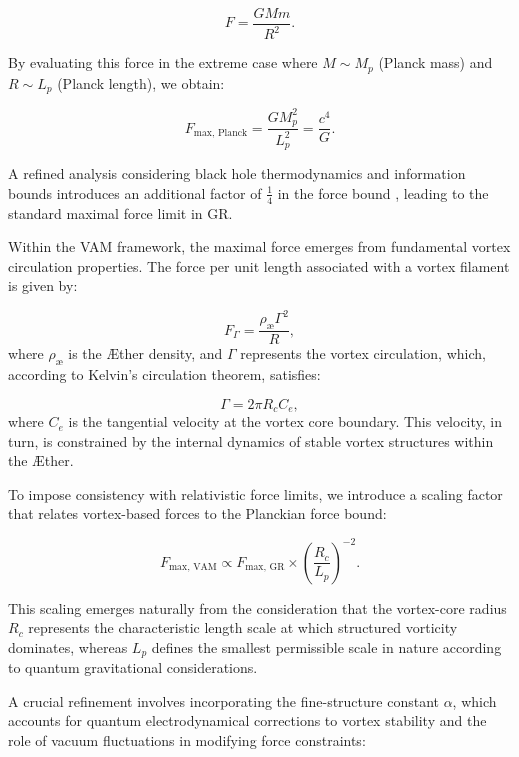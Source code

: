 \documentclass[a4paper,10pt]{article}
\begin{document}
\begin{equation*}
F = \frac{GMm}{R^2}.
\end{equation*}


By evaluating this force in the extreme case where $M \sim M_p$ (Planck mass) and $R \sim L_p$ (Planck length), we obtain:


\begin{equation*}
F_\text{max, Planck} = \frac{G M_p^2}{L_p^2} = \frac{c^4}{G}.
\end{equation*}


A refined analysis considering black hole thermodynamics and information bounds introduces an additional factor of $\frac{1}{4}$ in the force bound \cite{Gibbons2002}, leading to the standard maximal force limit in GR.


Within the VAM framework, the maximal force emerges from fundamental vortex circulation properties. The force per unit length associated with a vortex filament is given by:


\begin{equation*}
F_{\Gamma} = \frac{\rho_\text{\ae} \Gamma^2}{R},
\end{equation*}
where $\rho_\text{\ae}$ is the Æther density, and $\Gamma$ represents the vortex circulation, which, according to Kelvin's circulation theorem, satisfies:


\begin{equation*}
\Gamma = 2\pi R_c C_e,
\end{equation*}
where $C_e$ is the tangential velocity at the vortex core boundary. This velocity, in turn, is constrained by the internal dynamics of stable vortex structures within the Æther.


To impose consistency with relativistic force limits, we introduce a scaling factor that relates vortex-based forces to the Planckian force bound:


\begin{equation*}
F_\text{max, VAM} \propto F_\text{max, GR} \times \left(\frac{R_c}{L_p}\right)^{-2}.
\end{equation*}


This scaling emerges naturally from the consideration that the vortex-core radius $R_c$ represents the characteristic length scale at which structured vorticity dominates, whereas $L_p$ defines the smallest permissible scale in nature according to quantum gravitational considerations.


A crucial refinement involves incorporating the fine-structure constant $\alpha$, which accounts for quantum electrodynamical corrections to vortex stability and the role of vacuum fluctuations in modifying force constraints:
\end{document}
